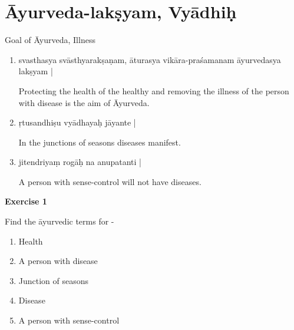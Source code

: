 \chapter{Āyurveda-lakṣyam, Vyādhiḥ}

\begin{center}
Goal of Āyurveda, Illness
\end{center}
\begin{enumerate}
\item {}

svasthasya svāsthyarakṣaṇam, āturasya vikāra-praśamanam āyurvedasya lakṣyam |             

Protecting the health of the healthy and removing the illness of the person with disease is the aim of Āyurveda.

\item {}

ṛtusandhiṣu vyādhayaḥ jāyante |

In the junctions of seasons diseases manifest.

\item {}

jitendriyaṃ rogāḥ na anupatanti |	

A person with sense-control will not have diseases. 
\end{enumerate}

\begin{center}
\textbf{\large Exercise 1}
\end{center}

Find the āyurvedic terms for -
\begin{enumerate}
\renewcommand{\theenumi}{\alph{enumi}}
\renewcommand{\labelenumi}{\theenumi.}
\item Health 
\item A person with disease 
\item Junction of seasons 
\item Disease 
\item A person with sense-control 
\end{enumerate}

